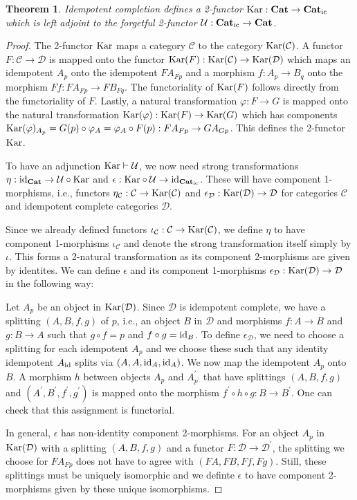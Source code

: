 \documentclass[12pt,oneside,reqno,a4paper]{article}
\newtheorem{theorem}{Theorem}[section]
\theoremstyle{definition}
\newcommand{\Cat}{\textbf{\textup{Cat}}}
\newcommand{\Catic}{\textbf{\textup{Cat}}_\textup{ic}}
\newcommand{\Kar}[1]{\textup{Kar}(#1)}
\newcommand{\Kartwo}{\textup{Kar}}
\renewcommand{\phi}{\varphi}
\newcommand{\id}{\textup{id}}
\newcommand{\C}{\mathcal{C}}
\newcommand{\D}{\mathcal{D}}
\newcommand{\U}{\mathcal{U}}
\newcommand{\p}{^\prime}
\begin{document}
\begin{theorem} \label{1adj}
Idempotent completion defines a 2-functor $\Kartwo:\Cat\to\Catic$ which is left adjoint to the forgetful 2-functor $\U:\Catic\to\Cat$.
\end{theorem} 

\begin{proof}
The 2-functor $\Kartwo$ maps a category $\C$ to the category $\Kar{\C}$. A functor $F:\C\to\D$ is mapped onto the functor $\Kar{F}:\Kar{\C}\to\Kar{\D}$ which maps an idempotent $A_p$ onto the idempotent $FA_{Fp}$ and a morphism $f:A_p\to B_q$ onto the morphism $Ff:FA_{Fp}\to FB_{Fq}$. The functoriality of $\Kar{F}$ follows directly from the functoriality of $F$. Lastly, a natural transformation $\phi:F\to G$ is mapped onto the natural transformation $\Kar{\phi}:\Kar{F}\to\Kar{G}$ which has components $\Kar{\phi}_{A_p}=G(p)\circ\phi_A=\phi_A\circ F(p):FA_{Fp}\to GA_{Gp}$. This defines the 2-functor $\Kartwo$.

To have an adjunction $\Kartwo\vdash\U$, we now need strong transformations $\eta:\id_\Cat\to \U\circ\Kartwo$ and $\epsilon: \Kartwo\circ\U\to \id_{\Catic}$. These will have component 1-morphisms, i.e., functors $\eta_\C:\C\to\Kar{\C}$ and $\epsilon_\D:\Kar{\D}\to \D$ for categories $\C$ and idempotent complete categories $\D$.

Since we already defined functors $\iota_\C:\C\to\Kar{\C}$, we define $\eta$ to have component 1-morphisms $\iota_\C$ and denote the strong transformation itself simply by $\iota$. This forms a 2-natural transformation as its component 2-morphisms are given by identites. We can define $\epsilon$ and its component 1-morphisms $\epsilon_\D:\Kar{\D}\to\D$ in the following way:

Let $A_p$ be an object in $\Kar{\D}$. Since $\D$ is idempotent complete, we have a splitting $(A,B,f,g)$ of $p$, i.e., an object $B$ in $\D$ and morphisms $f:A\to B$ and $g:B\to A$ such that $g\circ f=p$ and $f\circ g=\id_B$. To define $\epsilon_\D$, we need to choose a splitting for each idempotent $A_p$ and we choose these such that any identity idempotent $A_{\id}$ splits via $(A,A,\id_A,\id_A)$. We now map the idempotent $A_p$ onto $B$. A morphism $h$ between objects $A_p$ and $A\p_{p\p}$ that have splittings $(A,B,f,g)$ and $(A\p,B\p,f\p,g\p)$ is mapped onto the morphism $f\p\circ h\circ g:B\to B\p$. One can check that this assignment is functorial.

In general, $\epsilon$ has non-identity component 2-morphisms. For an object $A_p$ in $\Kar{\D}$ with a splitting $(A,B,f,g)$ and a functor $F:\D\to\D\p$, the splitting we choose for $FA_{Fp}$ does not have to agree with $(FA,FB,Ff,Fg)$. Still, these splittings must be uniquely isomorphic and we definte $\epsilon$ to have component 2-morphisms given by these unique isomorphisms.


\end{proof}
\end{document}
